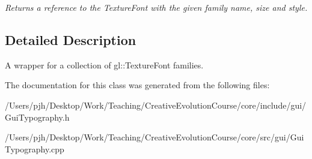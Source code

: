 \begin{DoxyCompactItemize}
\begin{DoxyCompactList}\small\item\em Returns a reference to the Texture\-Font with the given family name, size and style. \end{DoxyCompactList}\end{DoxyCompactItemize}


\subsection{Detailed Description}
A wrapper for a collection of gl\-::\-Texture\-Font families. 

The documentation for this class was generated from the following files\-:\begin{DoxyCompactItemize}
\item 
/\-Users/pjh/\-Desktop/\-Work/\-Teaching/\-Creative\-Evolution\-Course/core/include/gui/Gui\-Typography.\-h\item 
/\-Users/pjh/\-Desktop/\-Work/\-Teaching/\-Creative\-Evolution\-Course/core/src/gui/Gui\-Typography.\-cpp\end{DoxyCompactItemize}

